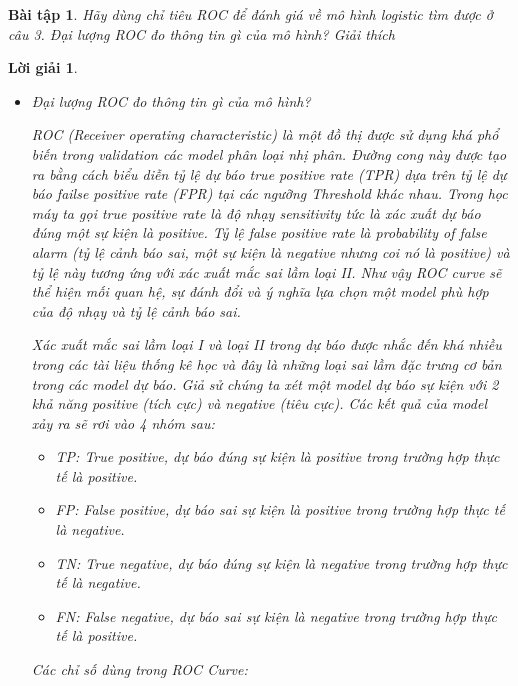 \documentclass[14pt, a4paper]{article}
\theoremstyle{sltheorem}
\newtheorem{baitap}{Bài tập}
\theoremstyle{soltheorem}
\newtheorem*{loigiai}{Lời giải}
\begin{document}
\begin{baitap}
    Hãy dùng chỉ tiêu ROC để đánh giá về mô hình logistic tìm được ở câu 3. Đại lượng ROC đo thông tin gì của mô hình? Giải thích
\end{baitap}

\begin{loigiai}
    \begin{itemize}
        \item Đại lượng ROC đo thông tin gì của mô hình?
        
        ROC (Receiver operating characteristic) là một đồ thị được sử dụng khá phổ biến trong validation các model phân loại nhị phân. Đường cong này được tạo ra bằng cách biểu diễn tỷ lệ dự báo true positive rate (TPR) dựa trên tỷ lệ dự báo failse positive rate (FPR) tại các ngưỡng Threshold khác nhau. 
        Trong học máy ta gọi true positive rate là độ nhạy sensitivity tức là xác xuất dự báo đúng một sự kiện là positive. Tỷ lệ false positive rate là probability of false alarm (tỷ lệ cảnh báo sai, một sự kiện là negative nhưng coi nó là positive) và tỷ lệ này tương ứng với xác xuất mắc sai lầm loại II. Như vậy ROC curve sẽ thể hiện mối quan hệ, sự đánh đổi và ý nghĩa lựa chọn một model phù hợp của độ nhạy và tỷ lệ cảnh báo sai.

        Xác xuất mắc sai lầm loại I và loại II trong dự báo được nhắc đến khá nhiều trong các tài liệu thống kê học và đây là những loại sai lầm đặc trưng cơ bản trong các model dự báo. Giả sử chúng ta xét một model dự báo sự kiện với 2 khả năng positive (tích cực) và negative (tiêu cực). Các kết quả của model xảy ra sẽ rơi vào 4 nhóm sau:

        \begin{itemize}
            \item TP: True positive, dự báo đúng sự kiện là positive trong trường hợp thực tế là positive.
            \item FP: False positive, dự báo sai sự kiện là positive trong trường hợp thực tế là negative.
            \item TN: True negative, dự báo đúng sự kiện là negative trong trường hợp thực tế là negative.
            \item FN: False negative, dự báo sai sự kiện là negative trong trường hợp thực tế là positive.
        \end{itemize}

        Các chỉ số dùng trong ROC Curve:


\end{itemize}
\end{loigiai}
\end{document}
